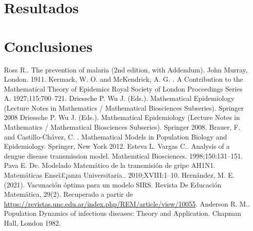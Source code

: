 \documentclass[journal]{IEEEtran}
\begin{document}
\section{Resultados}


\section{Conclusiones}


\ifCLASSOPTIONcaptionsoff
  \newpage
\fi

\begin{thebibliography}{1}

	Ross R.. The prevention of malaria (2nd edition, with Addendum). John Murray, London. 1911.
  Kermack, W. O. and McKendrick, A. G. . A Contribution to the Mathematical Theory of Epidemics
Royal Society of London Proceedings Series A. 1927;115:700–721.
  Driessche P. Wu J. (Eds.). Mathematical Epidemiology (Lecture Notes in Mathematics / Mathematical
Biosciences Subseries). Springer 2008
  Driessche P. Wu J. (Eds.). Mathematical Epidemiology (Lecture Notes in Mathematics / Mathematical
Biosciences Subseries). Springer 2008.
  Brauer, F. and Castillo-Chávez, C. . Mathematical Models in Population Biology and Epidemiology.
Springer, New York 2012.
  Esteva L. Vargas C.. Analysis of a dengue disease transmission model. Mathemtical Biosciences.
1998;150:131–151.
  Pava E. De. Modelado Matemático de la transmisión de gripe AH1N1. Matemáticas Enseï£¡anza
Universitaria.. 2010;XVIII:1–10.
  Hernández, M. E. (2021). Vacunación óptima para un modelo SIRS. Revista De Educación Matemática, 29(2).
Recuperado a partir de \url{https://revistas.unc.edu.ar/index.php/REM/article/view/10055}.
  Anderson R. M.. Population Dynamics of infectious diseases: Theory and Application. Chapman
Hall, London 1982.

\end{thebibliography}
\end{document}
